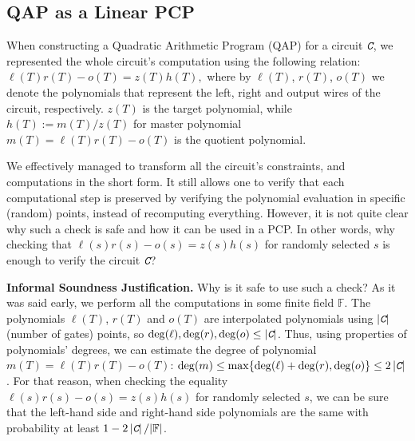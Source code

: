 \documentclass[../../book.tex]{subfiles}
\begin{document}
\subsection{QAP as a Linear PCP}

When constructing a Quadratic Arithmetic Program (QAP) for a circuit $\textit{\texttt{C}}$, we
represented the whole circuit's computation using the following relation:
$
    \ell(T)r(T) - o(T) = z(T)h(T),
$
where by $\ell(T)$, $r(T)$, $o(T)$ we denote the polynomials that represent the
left, right and output wires of the circuit, respectively. $z(T)$ is the target
polynomial, while $h(T) := m(T)\big/z(T)$ for master polynomial $m(T) =
\ell(T)r(T) - o(T)$ is the quotient polynomial.

We effectively managed to transform all the circuit's constraints, and
computations in the short form. It still allows one to verify that each
computational step is preserved by verifying the polynomial evaluation in
specific (random) points, instead of recomputing everything. However, it is not
quite clear why such a check is safe and how it can be used in a PCP. In other
words, why checking that $\ell(s)r(s)-o(s)=z(s)h(s)$ for randomly selected $s$
is enough to verify the circuit $\textit{\texttt{C}}$?

\textbf{Informal Soundness Justification.} Why is it safe to use such a check?
As it was said early, we perform all the computations in some finite field
$\mathbb{F}$. The polynomials $\ell(T)$, $r(T)$ and $o(T)$ are interpolated
polynomials using $\left| \textit{\texttt{C}} \right|$ (number of gates) points, so
$\deg(\ell), \deg(r), \deg(o) \leq \left|\textit{\texttt{C}}\right|$. Thus, using properties
of polynomials' degrees, we can estimate the degree of polynomial $m(T) =
\ell(T)r(T) - o(T)$: $\deg(m) \leq \max\{\deg(\ell) + \deg(r), \deg(o)\} \leq 2
\left| \textit{\texttt{C}} \right|$. For that reason, when checking the equality
$\ell(s)r(s)-o(s)=z(s)h(s)$ for randomly selected $s$, we can be sure that the
left-hand side and right-hand side polynomials are the same with probability at
least $1-2\left|\textit{\texttt{C}}\right|/|\mathbb{F}|$.
\end{document}
